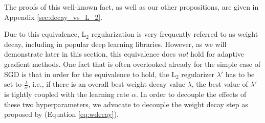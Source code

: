 The proofs of this well-known fact, as well as our other propositions, are given in Appendix \ref{sec:decay_vs_L_2}.

Due to this equivalence, L$_2$ regularization is very frequently referred to as weight decay, including in popular deep learning libraries. However, as we will demonstrate later in this section, this equivalence does \emph{not} hold for adaptive gradient methods. One fact that is often overlooked already for the simple case of SGD is that in order for the equivalence to hold, the L$_2$ regularizer $\lambda'$ has to be set to $\frac{\lambda}{\alpha}$, i.e., if there is an overall best weight decay value $\lambda$, the best value of $\lambda'$ is tightly coupled with the learning rate $\alpha$. 
In order to decouple the effects of these two hyperparameters, we advocate to decouple the weight decay step as proposed by \citet{hanson1988comparing} (Equation \ref{eq:wdecay}).

\begin{algorithm}[tb!]
\caption{\colorbox{Thistle}{SGD with L$_2$ regularization} and \colorbox{SpringGreen}{SGD with \textcolor{black}{decoupled} weight decay (SGDW)}, both with momentum}
\footnotesize
\label{algo_sgd}
\begin{algorithmic}[1]
\label{adam-Given}
\REPEAT
	  
	 \label{sgd-computegrad}
		
	 \label{sgd-mom1} 
	  \label{sgd-xupdate} 
\end{algorithmic}
\end{algorithm}

